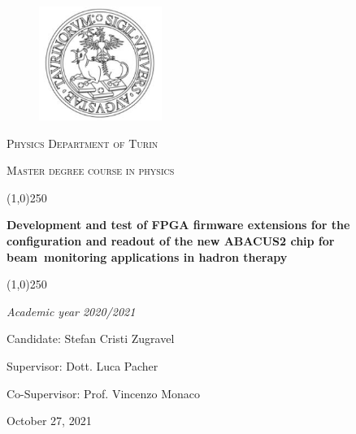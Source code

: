 \documentclass[10pt, a4paper, twoside, onpenany]{report}
\begin{document}
	
	\begin{titlepage}
		\centering
		\begin{figure}[H]
			\centering
			\includegraphics[width=0.356\textwidth]{img/logo_unito.JPG}
		\end{figure}
		\vspace{1cm}
		{\scshape\LARGE Physics Department of Turin \par}
		{\scshape\LARGE Master degree course in physics \par}
		\vspace{1.5cm}
		\line(1,0){250}\\
		{\Huge \textbf{Development and test of FPGA firmware extensions for the configuration and readout of the new ABACUS2 chip for beam~monitoring applications in hadron therapy} \par}
		\line(1,0){250}\\	
		\vspace{1.5cm}
		{\Large\itshape Academic year 2020/2021\par}
		\vspace{1cm}
		{\large Candidate: Stefan Cristi Zugravel \par} 
		{\large Supervisor: Dott. Luca Pacher \par}
		{\large Co-Supervisor: Prof. Vincenzo Monaco \par}
		
		\vfill
		
		{\large October 27, 2021\par}
	\end{titlepage}
\end{document}
